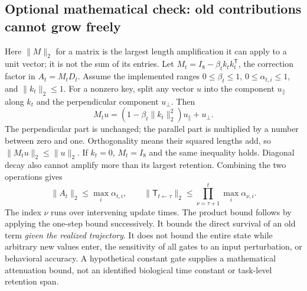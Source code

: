 \documentclass[10pt,letterpaper]{article}
\begin{document}
\subsection{Optional mathematical check: old contributions cannot grow freely}
Here $\lVert M\rVert_2$ for a matrix is the largest length amplification it can apply to a unit vector; it is not the sum of its entries. Let $M_t=I_8-\beta_t k_tk_t^{\mathsf T}$, the correction factor in $A_t=M_tD_t$. Assume the implemented ranges $0\leq\beta_t\leq1$, $0\leq\alpha_{t,i}\leq1$, and $\lVert k_t\rVert_2\leq1$. For a nonzero key, split any vector $u$ into the component $u_{\parallel}$ along $k_t$ and the perpendicular component $u_{\perp}$. Then
\begin{equation}
M_tu=(1-\beta_t\lVert k_t\rVert_2^2)u_{\parallel}+u_{\perp}.
\end{equation}
The perpendicular part is unchanged; the parallel part is multiplied by a number between zero and one. Orthogonality means their squared lengths add, so $\lVert M_tu\rVert_2\leq\lVert u\rVert_2$. If $k_t=0$, $M_t=I_8$ and the same inequality holds. Diagonal decay also cannot amplify more than its largest retention. Combining the two operations gives
\begin{equation}
\lVert A_t\rVert_2\leq\max_i\alpha_{t,i},\qquad
\lVert\mathsf T_{t\leftarrow\tau}\rVert_2
\leq\prod_{\nu=\tau+1}^{t}\max_i\alpha_{\nu,i}.
\end{equation}
The index $\nu$ runs over intervening update times. The product bound follows by applying the one-step bound successively. It bounds the direct survival of an old term \emph{given the realized trajectory}. It does not bound the entire state while arbitrary new values enter, the sensitivity of all gates to an input perturbation, or behavioral accuracy. A hypothetical constant gate supplies a mathematical attenuation bound, not an identified biological time constant or task-level retention span.
\end{document}
